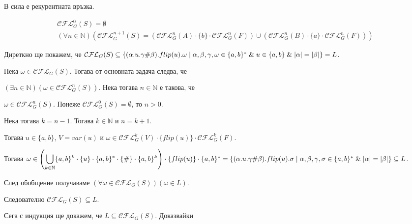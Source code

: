 \documentclass[12pt]{article}
\begin{document}
\vspace*{5mm}

\par В сила е рекурентната връзка.

\begin{align*}
    \mathcal{CFL}_G^0(S) = \emptyset \\
    (\forall n \in \mathbb N)(\mathcal{CFL}_G^{n + 1}(S) = (\mathcal{CFL}_G^n(A) \cdot \{b\} \cdot \mathcal{CFL}_G^n(F)) \cup (\mathcal{CFL}_G^n(B) \cdot \{a\} \cdot \mathcal{CFL}_G^n(F)))
\end{align*}

Диреткно ще покажем, че \(\mathcal{CFL}_G(S) \subseteq \\
\{(\alpha.u.\gamma\#\beta).flip(u).\omega \mid \alpha, \beta, \gamma, \omega \in \{a, b\}^* \;\&\; u \in \{a, b\} \;\&\; |\alpha| = |\beta|\}= L\).

\vspace*{5mm}

\par Нека \(\omega \in \mathcal{CFL}_G(S)\).
Тогава от основната задача следва, че 

\((\exists n \in \mathbb N)(\omega \in \mathcal{CFL}^n_G(S))\).
Нека тогава \(n \in \mathbb N\) е такова, че

\(\omega \in \mathcal{CFL}^n_G(S)\).
Понеже \(\mathcal{CFL}_G^0(S) = \emptyset\), то \(n > 0\).

Нека тогава \(k = n - 1\). Тогава \(k \in \mathbb N\) и \(n = k + 1\).

Тогава \(u \in \{a, b\}\), \(V = var(u)\) и \(\omega \in \mathcal{CFL}_G^k(V) \cdot \{flip(u)\} \cdot \mathcal{CFL}_G^k(F)\).

Тогава \(\omega \in \left( \displaystyle\bigcup_{k \in \mathbb{N}} \{a, b\}^k \cdot \{u\} \cdot \{a, b\}^* \cdot \{\#\} \cdot \{a, b\}^k \right) \cdot \{flip(u)\} \cdot \{a, b\}^* \\
= \{(\alpha.u.\gamma\#\beta).flip(u).\sigma \mid \alpha, \beta, \gamma, \sigma \in \{a, b\}^* \;\&\; |\alpha| = |\beta|\} \subseteq L\).

След обобщение получаваме \((\forall \omega \in \mathcal{CFL}_G(S))(\omega \in L)\).

Следователно \(\mathcal{CFL}_G(S) \subseteq L\).

\vspace*{5mm}

\par Сега с индукция ще докажем, че \(L \subseteq \mathcal{CFL}_G(S)\). Доказвайки
\end{document}
